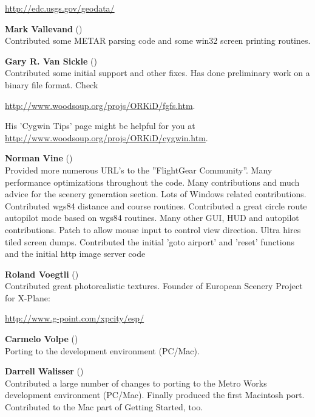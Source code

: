 \href{http://edc.usgs.gov/geodata/}{http://edc.usgs.gov/geodata/}
 \medskip

\noindent \textbf{Mark Vallevand}
()\\
  Contributed some METAR parsing code and some win32 screen printing routines.
\medskip

\noindent \textbf{Gary R. Van Sickle}
()\\
  Contributed some initial  support and other fixes. Has done
  preliminary work on a binary file format. Check
  \medskip

 \href{http://www.woodsoup.org/projs/ORKiD/fgfs.htm}{http://www.woodsoup.org/projs/ORKiD/fgfs.htm}.
 \medskip


  His 'Cygwin Tips' page might be helpful for you at
  \medskip
  \href{http://www.woodsoup.org/projs/ORKiD/cygwin.htm}{http://www.woodsoup.org/projs/ORKiD/cygwin.htm}.
  \medskip

\noindent \textbf{Norman Vine} ()\\
  Provided more numerous URL's to the ''FlightGear Community''.
  Many performance optimizations throughout the code.  Many contributions
  and much advice for the scenery generation section.  Lots of Windows
  related contributions. Contributed wgs84 distance and course routines.
  Contributed a great circle route autopilot mode based on wgs84 routines.
  Many other GUI, HUD and autopilot contributions.  Patch to allow mouse input to control view direction. Ultra hires tiled screen dumps. Contributed the initial 'goto airport' and 'reset' functions and the initial http image server code
\medskip

\noindent \textbf{Roland Voegtli}
()\\
 Contributed great photorealistic textures.   Founder of European Scenery Project for
 X-Plane:
 \medskip

  \href{http://www.g-point.com/xpcity/esp/}{http://www.g-point.com/xpcity/esp/}
\medskip


\noindent \textbf{Carmelo Volpe}
()\\
  Porting \FlightGear{} to the  development environment
  (PC/Mac).
 \medskip

\noindent \textbf{Darrell Walisser}
()\\
 Contributed a large number of changes to porting \FlightGear{} to the Metro Works development environment (PC/Mac). Finally produced the first Macintosh port. Contributed to the Mac part of Getting Started, too.
\medskip

